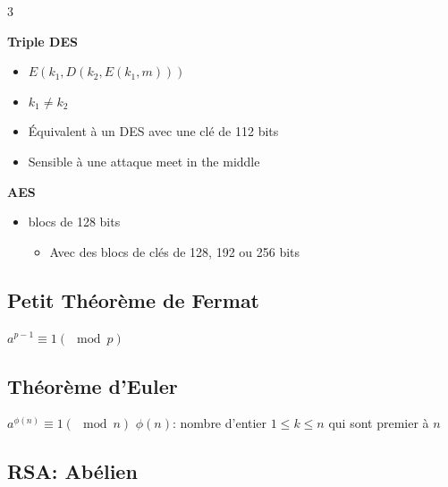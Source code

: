 \documentclass[9pt, a4paper, twoside]{article}
\begin{document}
\begin{multicols}{3}
\begin{flushleft}
    \scriptsize \textbf{Triple DES}
\end{flushleft}

\begin{itemize}[label={}]
    \item \scriptsize $E(k_{1}, D(k_{2}, E(k_{1}, m)))$
    \item \scriptsize $k_{1} \neq k_{2}$
    \item \scriptsize Équivalent à un DES avec une clé de 112 bits
    \item \scriptsize Sensible à une attaque meet in the middle
\end{itemize}

\begin{flushleft}
    \scriptsize \textbf{AES}
\end{flushleft}

\begin{itemize}[label={}]
    \item \scriptsize blocs de 128 bits
    \begin{itemize}[label=$\rightarrow$]
        \item \scriptsize Avec des blocs de clés de 128, 192 ou 256 bits
    \end{itemize}
\end{itemize}

\footnotesize \subsection{Petit Théorème de Fermat}

\begin{flushleft}
    \scriptsize $a^{p-1} \equiv 1(\mod p)$
\end{flushleft}

\footnotesize \subsection{Théorème d'Euler}

\begin{flushleft}
    \scriptsize $a^{\phi(n)} \equiv 1(\mod n)$
    \scriptsize $\phi(n)$: nombre d'entier $1 \le k \le n$ qui sont premier à $n$
\end{flushleft}

\footnotesize \subsection{RSA: Abélien}


\end{multicols}
\end{document}
